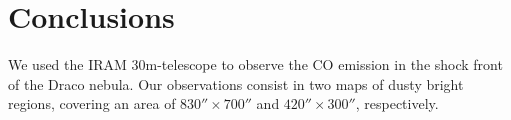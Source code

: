 \documentclass[traditabstract]{aa}
\begin{document}
%

\section{Conclusions}
\label{sec:conclusion}

   We used the IRAM 30m-telescope to observe the CO emission in the shock front of the Draco nebula. Our observations consist in two maps of dusty bright regions, covering an area of $830''\times 700''$ and $420''\times 300''$, respectively.
\end{document}
